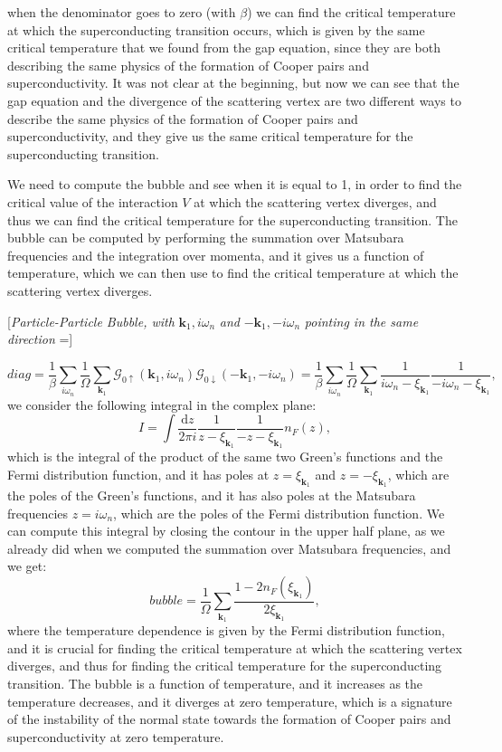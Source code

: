 when the denominator goes to zero (with \(\beta\)) we can find the critical temperature at which the superconducting transition occurs, which is given by the same critical temperature that we found from the gap equation, since they are both describing the same physics of the formation of Cooper pairs and superconductivity. It was not clear at the beginning, but now we can see that the gap equation and the divergence of the scattering vertex are two different ways to describe the same physics of the formation of Cooper pairs and superconductivity, and they give us the same critical temperature for the superconducting transition.

We need to compute the bubble and see when it is equal to 1, in order to find the critical value of the interaction \(V\) at which the scattering vertex diverges, and thus we can find the critical temperature for the superconducting transition. The bubble can be computed by performing the summation over Matsubara frequencies and the integration over momenta, and it gives us a function of temperature, which we can then use to find the critical temperature at which the scattering vertex diverges.

    [\textit{Particle-Particle Bubble, with} \(\mathbf{k}_1,i \omega_n\) \textit{and} \(-\mathbf{k}_1, -i \omega_n\) \textit{pointing in the same direction} =]

\[
    diag = \frac{1}{\beta} \sum_{i \omega_n} \frac{1}{\Omega} \sum_{\mathbf{k}_1} \mathcal{G}_{0 \uparrow}(\mathbf{k}_1, i \omega_n) \mathcal{G}_{0 \downarrow}(-\mathbf{k}_1, -i \omega_n) = \frac{1}{\beta} \sum_{i \omega_n} \frac{1}{\Omega} \sum_{\mathbf{k}_1} \frac{1}{i \omega_n - \xi_{\mathbf{k}_1}} \frac{1}{-i \omega_n - \xi_{\mathbf{k}_1}},
\]
we consider the following integral in the complex plane:
\[
    I = \int \frac{\mathrm{d} z}{2 \pi i} \frac{1}{z - \xi_{\mathbf{k}_1}} \frac{1}{-z - \xi_{\mathbf{k}_1}} n_F(z),
\]
which is the integral of the product of the same two Green's functions and the Fermi distribution function, and it has poles at \(z = \xi_{\mathbf{k}_1}\) and \(z = -\xi_{\mathbf{k}_1}\), which are the poles of the Green's functions, and it has also poles at the Matsubara frequencies \(z = i \omega_n\), which are the poles of the Fermi distribution function. We can compute this integral by closing the contour in the upper half plane, as we already did when we computed the summation over Matsubara frequencies, and we get:
\[
    bubble = \frac{1}{\Omega} \sum_{\mathbf{k}_1} \frac{1 - 2 n_F(\xi_{\mathbf{k}_1})}{2 \xi_{\mathbf{k}_1}},
\]
where the temperature dependence is given by the Fermi distribution function, and it is crucial for finding the critical temperature at which the scattering vertex diverges, and thus for finding the critical temperature for the superconducting transition. The bubble is a function of temperature, and it increases as the temperature decreases, and it diverges at zero temperature, which is a signature of the instability of the normal state towards the formation of Cooper pairs and superconductivity at zero temperature.

